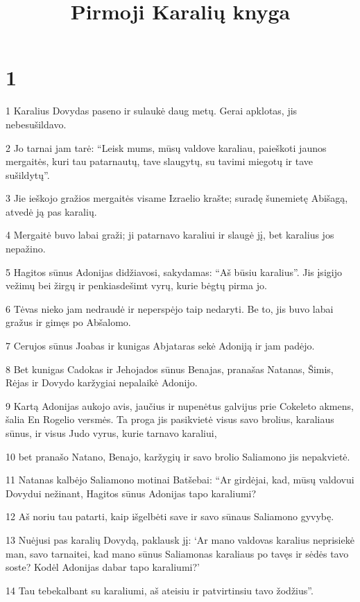 

\title{Pirmoji Karalių knyga}

\chapter{1}

\par 1 Karalius Dovydas paseno ir sulaukė daug metų. Gerai apklotas, jis nebesušildavo. 
\par 2 Jo tarnai jam tarė: “Leisk mums, mūsų valdove karaliau, paieškoti jaunos mergaitės, kuri tau patarnautų, tave slaugytų, su tavimi miegotų ir tave sušildytų”. 
\par 3 Jie ieškojo gražios mergaitės visame Izraelio krašte; suradę šunemietę Abišagą, atvedė ją pas karalių. 
\par 4 Mergaitė buvo labai graži; ji patarnavo karaliui ir slaugė jį, bet karalius jos nepažino. 
\par 5 Hagitos sūnus Adonijas didžiavosi, sakydamas: “Aš būsiu karalius”. Jis įsigijo vežimų bei žirgų ir penkiasdešimt vyrų, kurie bėgtų pirma jo. 
\par 6 Tėvas nieko jam nedraudė ir neperspėjo taip nedaryti. Be to, jis buvo labai gražus ir gimęs po Abšalomo. 
\par 7 Cerujos sūnus Joabas ir kunigas Abjataras sekė Adoniją ir jam padėjo. 
\par 8 Bet kunigas Cadokas ir Jehojados sūnus Benajas, pranašas Natanas, Šimis, Rėjas ir Dovydo karžygiai nepalaikė Adonijo. 
\par 9 Kartą Adonijas aukojo avis, jaučius ir nupenėtus galvijus prie Cokeleto akmens, šalia En Rogelio versmės. Ta proga jis pasikvietė visus savo brolius, karaliaus sūnus, ir visus Judo vyrus, kurie tarnavo karaliui, 
\par 10 bet pranašo Natano, Benajo, karžygių ir savo brolio Saliamono jis nepakvietė. 
\par 11 Natanas kalbėjo Saliamono motinai Batšebai: “Ar girdėjai, kad, mūsų valdovui Dovydui nežinant, Hagitos sūnus Adonijas tapo karaliumi? 
\par 12 Aš noriu tau patarti, kaip išgelbėti save ir savo sūnaus Saliamono gyvybę. 
\par 13 Nuėjusi pas karalių Dovydą, paklausk jį: ‘Ar mano valdovas karalius neprisiekė man, savo tarnaitei, kad mano sūnus Saliamonas karaliaus po tavęs ir sėdės tavo soste? Kodėl Adonijas dabar tapo karaliumi?’ 
\par 14 Tau tebekalbant su karaliumi, aš ateisiu ir patvirtinsiu tavo žodžius”. 
